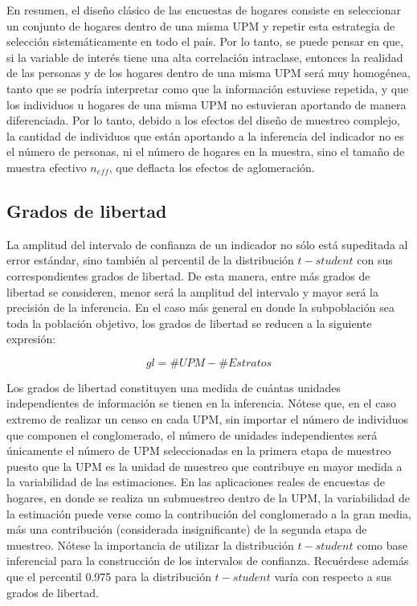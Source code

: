 \documentclass[
  12pt,
]{book}
\begin{document}
En resumen, el diseño clásico de las encuestas de hogares consiste en seleccionar un conjunto de hogares dentro de una misma UPM y repetir esta estrategia de selección sistemáticamente en todo el país. Por lo tanto, se puede pensar en que, si la variable de interés tiene una alta correlación intraclase, entonces la realidad de las personas y de los hogares dentro de una misma UPM será muy homogénea, tanto que se podría interpretar como que la información estuviese repetida, y que los individuos u hogares de una misma UPM no estuvieran aportando de manera diferenciada. Por lo tanto, debido a los efectos del diseño de muestreo complejo, la cantidad de individuos que están aportando a la inferencia del indicador no es el número de personas, ni el número de hogares en la muestra, sino el tamaño de muestra efectivo \(n_{eff}\), que deflacta los efectos de aglomeración.

\hypertarget{grados-de-libertad}{%
\subsection{Grados de libertad}\label{grados-de-libertad}}

La amplitud del intervalo de confianza de un indicador no sólo está supeditada al error estándar, sino también al percentil de la distribución \(t-student\) con sus correspondientes grados de libertad. De esta manera, entre más grados de libertad se consideren, menor será la amplitud del intervalo y mayor será la precisión de la inferencia. En el caso más general en donde la subpoblación sea toda la población objetivo, los grados de libertad se reducen a la siguiente expresión:

\[
gl = \# UPM - \# Estratos
\]

Los grados de libertad constituyen una medida de cuántas unidades independientes de información se tienen en la inferencia. Nótese que, en el caso extremo de realizar un censo en cada UPM, sin importar el número de individuos que componen el conglomerado, el número de unidades independientes será únicamente el número de UPM seleccionadas en la primera etapa de muestreo puesto que la UPM es la unidad de muestreo que contribuye en mayor medida a la variabilidad de las estimaciones. En las aplicaciones reales de encuestas de hogares, en donde se realiza un submuestreo dentro de la UPM, la variabilidad de la estimación puede verse como la contribución del conglomerado a la gran media, más una contribución (considerada insignificante) de la segunda etapa de muestreo. Nótese la importancia de utilizar la distribución \(t-student\) como base inferencial para la construcción de los intervalos de confianza. Recuérdese además que el percentil 0.975 para la distribución \(t-student\) varía con respecto a sus grados de libertad.
\end{document}
